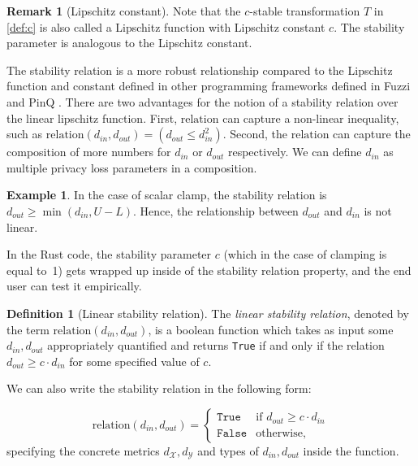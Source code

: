 \documentclass[11pt,a4paper]{article}
\theoremstyle{definition}
\newtheorem{remark}[theorem]{Remark}
\newtheorem{definition}[theorem]{Definition}
\newtheorem{example}[theorem]{Example}
\newcommand{\din}{d_{in}}
\newcommand{\dout}{d_{out}}
\newcommand{\Relation}{\mathrm{relation}}
\newcommand{\X}{\mathcal{X}}
\newcommand{\Y}{\mathcal{Y}}
\newcommand{\True}{\texttt{True}}
\newcommand{\False}{\texttt{False}}
\newcommand{\grace}[1]{{ {\color{purple}{(grace)~#1}}}}
\newcommand{\connor}[1]{{ {\color{teal}{(connor)~#1}}}}
\begin{document}
\connor{Should we include the remark below?}

\begin{remark}[Lipschitz constant]
    Note that the $c$-stable transformation $T$ in \ref{def:c} is also called a Lipschitz function with Lipschitz constant $c$. The stability parameter is analogous to the Lipschitz constant.
\end{remark}

The stability relation is a more robust relationship compared to the Lipschitz function and constant defined in other programming frameworks defined in Fuzzi and PinQ \grace{TODO cite these?}. There are two advantages for the notion of a stability relation over the linear lipschitz function. First, $\Relation$ can capture a non-linear inequality, such as $\Relation(\din, \dout) = (\dout \leq \din^2)$. Second, the $\Relation$ can capture the composition of more numbers for $\din$ or $\dout$ respectively. We can define $\din$ as multiple privacy loss parameters in a composition. \grace{Composition has not been implemented yet in Prog Framework.}
\grace{Even though we said that not all stability relations can be expressed only with linear relationship, we don't have a more general definition that encompasses broader notions.}

\begin{example}
    In the case of scalar clamp, the stability relation is $\dout \geq \min(\din, U - L)$. Hence, the relationship between $\dout$ and $\din$ is not linear.
\end{example}

In the Rust code, the stability parameter $c$ (which in the case of clamping is equal to~1) gets wrapped up inside of the stability relation property, and the end user can test it empirically.

\begin{definition}[Linear stability relation]
    The \textit{linear stability relation}, denoted by the term $\Relation(\din, \dout)$, is a boolean function which takes as input some $\din, \dout$ appropriately quantified and returns \texttt{True} if and only if the relation $\dout \geq c \cdot \din$ for some specified value of $c$. 
\end{definition}

We can also write the stability relation in the following form:

\begin{equation}
    \Relation(\din, \dout) = 
    \begin{cases} 
      \True & \textrm{if } \dout \geq c \cdot \din \\
      \False & \textrm{otherwise},
   \end{cases}
\end{equation}
specifying the concrete metrics $d_{\X}, d_{\Y}$ and types of $\din, \dout$ inside the function.
\end{document}

